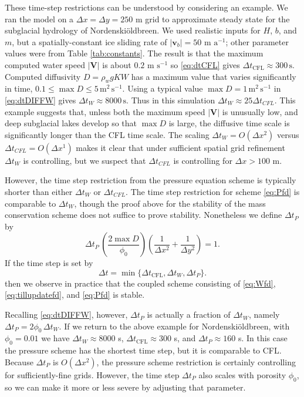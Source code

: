 \documentclass[gmd]{copernicus}   %
\newcommand{\text}{\textrm}
\newcommand\bV{\mathbf{V}}
\newcommand{\Nbreen}{Nordenski\"oldbreen\xspace}
\begin{document}
These time-step restrictions can be understood by considering an example.  We ran the model on a $\Delta x = \Delta y = 250$ m grid to approximate steady state for the subglacial hydrology of \Nbreen \citep{vanPeltthesis}.  We used realistic inputs for $H$, $b$, and $m$, but a spatially-constant ice sliding rate of $|\mathbf{v}_b|=50$ m $\text{a}^{-1}$; other parameter values were from Table \ref{tab:constants}.  The result is that the maximum computed water speed $|\bV|$ is about $0.2$ m $\text{s}^{-1}$ so \eqref{eq:dtCFL} gives $\Delta t_{\text{CFL}} \approx 300\,\text{s}$.  Computed diffusivity $D = \rho_w g K W$ has a maximum value that varies significantly in time, $0.1 \le \max D \le 5 \,\text{m}^2\,\text{s}^{-1}$.  Using a typical value $\max D=1\,\text{m}^2\,\text{s}^{-1}$ in \eqref{eq:dtDIFFW} gives $\Delta t_W \approx 8000\,\text{s}$.  Thus in this simulation $\Delta t_W \approx 25 \Delta t_{CFL}$.  This example suggests that, unless both the maximum speed $|\mathbf{V}|$ is unusually low, and deep subglacial lakes develop so that $\max D$ is large, the diffusive time scale is significantly longer than the CFL time scale.  The scaling $\Delta t_W = O(\Delta x^2)$ versus $\Delta t_{CFL} = O(\Delta x^1)$ makes it clear that under sufficient spatial grid refinement $\Delta t_W$ is controlling, but we suspect that $\Delta t_{CFL}$ is controlling for $\Delta x > 100$ m.

However, the time step restriction from the pressure equation scheme is typically shorter than either $\Delta t_W$ or $\Delta t_{CFL}$.  The time step restriction for scheme \eqref{eq:Pfd} is comparable to $\Delta t_W$, though the proof above for the stability of the mass conservation scheme does not suffice to prove stability.  Nonetheless we define $\Delta t_P$ by
\begin{equation}
\Delta t_P\, \left(\frac{2 \max D}{\phi_0}\right) \left(\frac{1}{\Delta x^2} + \frac{1}{\Delta y^2}\right) = 1. \label{eq:dtDIFFP}
\end{equation}
If the time step is set by
\begin{equation}
\Delta t = \min\{\Delta t_{\text{CFL}}, \Delta t_W, \Delta t_P\}.  \label{eq:stablecombined}
\end{equation}
then we observe in practice that the coupled scheme consisting of \eqref{eq:Wfd}, \eqref{eq:tillupdatefd}, and \eqref{eq:Pfd} is stable.

Recalling \eqref{eq:dtDIFFW}, however, $\Delta t_P$ is actually a fraction of $\Delta t_W$, namely $\Delta t_P = 2 \phi_0\, \Delta t_W$.  If we return to the above example for \Nbreen, with $\phi_0 = 0.01$ we have $\Delta t_W \approx 8000$ s, $\Delta t_{\text{CFL}} \approx 300$ s, and $\Delta t_P \approx 160$ s.  In this case the pressure scheme has the shortest time step, but it is comparable to CFL.  Because $\Delta t_P$ is $O(\Delta x^2)$, the pressure scheme restriction is certainly controlling for sufficiently-fine grids.  However, the time step $\Delta t_P$ also scales with porosity $\phi_0$, so we can make it more or less severe by adjusting that parameter.
\end{document}
